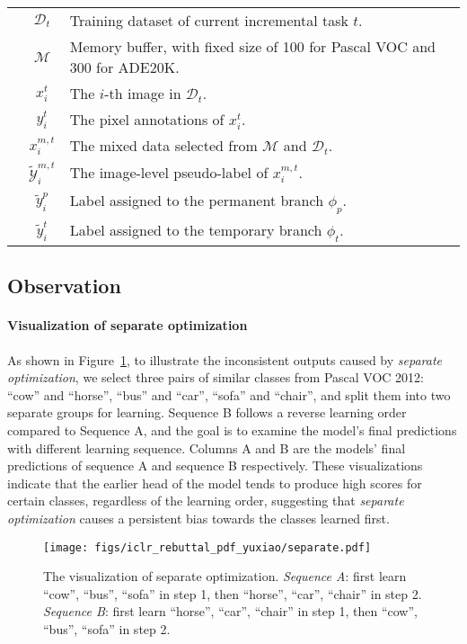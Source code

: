 \begin{table}[h]
\begin{tabular}{c c | l}
        &\(\mathcal{D}_t\) & Training dataset of current incremental task $t$. \\
        &\(\mathcal{M}\) & Memory buffer, with fixed size of 100 for Pascal VOC and 300 for ADE20K. \\
        &\(x^t_i\) & The $i$-th image in \(\mathcal{D}_t\). \\
        &\(y^t_i\) & The pixel annotations of \(x^t_i\). \\
        &\(x^{m,t}_i\) & The mixed data selected from  \(\mathcal{M}\) and \(\mathcal{D}_t\). \\
        &\(\tilde{\mathcal{Y}}_{i}^{m,t}\) & The image-level pseudo-label of \(x^{m,t}_i\). \\
        &\(\tilde{y}_{i}^{p}\) & Label assigned to the permanent branch \(\phi_p\). \\
        &\(\tilde{y}_{i}^{t}\) & Label assigned to the temporary branch \(\phi_t\). \\
        \bottomrule
    \end{tabular}
    \label{tab:symbol}
\end{table}


\subsection{Observation}

\paragraph{Visualization of separate optimization}As shown in Figure~\ref{fig:vis_so}, to illustrate the inconsistent outputs caused by \textit{separate optimization}, we select three pairs of similar classes from Pascal VOC 2012: ``cow'' and ``horse'', ``bus'' and ``car'', ``sofa'' and ``chair'', and split them into two separate groups for learning. Sequence B follows a reverse learning order compared to Sequence A, and the goal is to examine the model's final predictions with different learning sequence. Columns A and B are the models' final predictions of sequence A and sequence B respectively. These visualizations indicate that the earlier head of the model tends to produce high scores for certain classes, regardless of the learning order, suggesting that \textit{separate optimization} causes a persistent bias towards the classes learned first.

\begin{figure}[h]
    \centering
    \texttt{[image: figs/iclr\_rebuttal\_pdf\_yuxiao/separate.pdf]}
    \caption{The visualization of separate optimization. \textit{Sequence A}: first learn ``cow'', ``bus'', ``sofa'' in step 1, then ``horse'', ``car'', ``chair'' in step 2. \textit{Sequence B}: first learn ``horse'', ``car'', ``chair'' in step 1, then ``cow'', ``bus'', ``sofa'' in step 2.
    }
    \label{fig:vis_so}
    \vspace{-5pt}
\end{figure}

